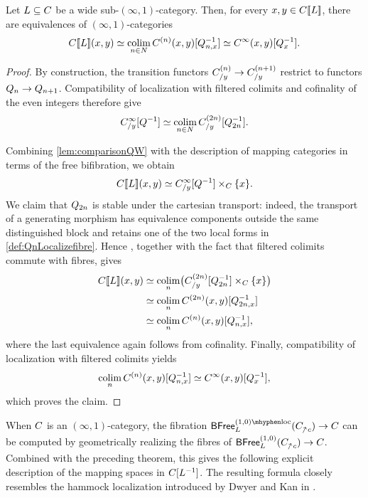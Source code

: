 \documentclass[a4paper,reqno,twoside]{amsart}
\begin{document}
\begin{theorem}\label{thm:mappingcatform}
	Let $\relax{L}\subseteq\relax{C}$ be a wide sub-$(\infty,1)$-category. Then, for every $x,y\in\relax{C}[\![\relax{L}]\!]$, there are equivalences of $(\infty,1)$-categories
	\[
		\relax{C}[\![\relax{L}]\!](x,y)
		\simeq \operatorname*{colim}_{n\in\relax{N}}\relax{C}^{(n)}(x,y)[\relax{Q}_{n,x}^{-1}]
		\simeq \relax{C}^{\infty}(x,y)[\relax{Q}_x^{-1}].
	\]
\end{theorem}
\begin{proof}
	By construction, the transition functors $\relax{C}^{(n)}_{/y}\to\relax{C}^{(n+1)}_{/y}$ restrict to functors $\relax{Q}_n\to\relax{Q}_{n+1}$. Compatibility of localization with filtered colimits and cofinality of the even integers therefore give
	\[
		\relax{C}_{/y}^{\infty}[\relax{Q}^{-1}]
		\simeq \operatorname*{colim}_{n\in\relax N}\relax{C}^{(2n)}_{/y}[\relax{Q}_{2n}^{-1}].
	\]

	Combining \cref{lem:comparisonQW} with the description of mapping categories in terms of the free bifibration, we obtain
	\[
		\relax{C}[\![\relax{L}]\!](x,y)
		\simeq \relax{C}_{/y}^{\infty}[\relax{Q}^{-1}]\times_{\relax{C}}\{x\}.
	\]
	We claim that $\relax{Q}_{2n}$ is stable under the cartesian transport: indeed, the transport of a generating morphism has equivalence components outside the same distinguished block and retains one of the two local forms in \cref{def:QnLocalizefibre}. Hence \cite[Theorem 4.7.1]{AHM26}, together with the fact that filtered colimits commute with fibres, gives
	\[
	\begin{aligned}
		\relax{C}[\![\relax{L}]\!](x,y)
		&\simeq \operatorname*{colim}_n\bigl(\relax{C}_{/y}^{(2n)}[\relax{Q}_{2n}^{-1}]\times_{\relax{C}}\{x\}\bigr) \\
		&\simeq \operatorname*{colim}_n\relax{C}^{(2n)}(x,y)[\relax{Q}_{2n,x}^{-1}] \\
		&\simeq \operatorname*{colim}_n\relax{C}^{(n)}(x,y)[\relax{Q}_{n,x}^{-1}],
	\end{aligned}
	\]
	where the last equivalence again follows from cofinality. Finally, compatibility of localization with filtered colimits yields
	\[
		\operatorname*{colim}_n\relax{C}^{(n)}(x,y)[\relax{Q}_{n,x}^{-1}]
		\simeq \relax{C}^{\infty}(x,y)[\relax{Q}_x^{-1}],
	\]
	which proves the claim.
\end{proof}

When $\relax{C}$ is an $(\infty,1)$-category, the fibration $\BFree^{(1,0)\mhyphen\loc}_{\cL}(\cC_{\upslash c}) \to \cC$ can be computed by geometrically realizing the fibres of $\BFree^{(1,0)}_{\cL}(\cC_{\upslash c}) \to \cC$. Combined with the preceding theorem, this gives the following explicit description of the mapping spaces in $\relax{C}[\relax{L}^{-1}]$. The resulting formula closely resembles the hammock localization introduced by Dwyer and Kan in \cite{DwyerKan1980Calculating}.
\end{document}
